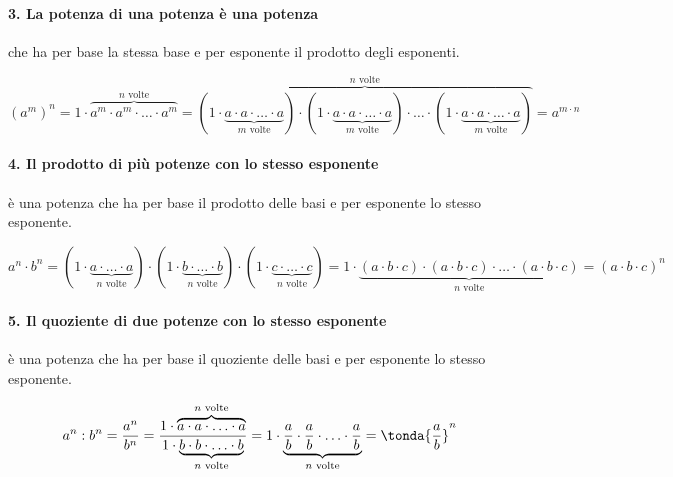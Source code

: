 \vspace{-1.5em}
\paragraph{3. La potenza di una potenza è una potenza} 
che ha per base la stessa base e per esponente il prodotto degli esponenti.

\[(a^m)^n =
1 \cdot \overbrace{a^m\cdot a^m\cdot\ldots\cdot a^m}^{n\text{ volte}}%
 =\overbrace{(1 \cdot \underbrace{a\cdot a\cdot\ldots\cdot a}_{m\text{ 
volte}})\cdot%
   (1 \cdot \underbrace{a\cdot a\cdot\ldots\cdot a}_{m\text{ 
volte}})\cdot\ldots\cdot%
   (1 \cdot \underbrace{a\cdot a\cdot\ldots\cdot a}_{m\text{ 
volte}})}^{n\text{ volte}}%
   =a^{m\cdot n}\]
   
\vspace{-1.5em}
\paragraph{4. Il prodotto di più potenze con lo stesso esponente} 
è una potenza che ha per base il prodotto delle basi e per esponente lo stesso
esponente.

\[a^n \cdot b^n=
  (1 \cdot \underbrace{a \cdot \ldots \cdot a}_{n\text{ volte}}) \cdot
  (1 \cdot \underbrace{b \cdot \ldots \cdot b}_{n\text{ volte}}) \cdot
  (1 \cdot \underbrace{c \cdot \ldots \cdot c}_{n\text{ volte}})=
  1 \cdot \underbrace{(a \cdot b \cdot c) \cdot (a \cdot b \cdot c) \cdot
              \ldots \cdot (a \cdot b \cdot c)}_{n\text{ volte}}=
   (a \cdot b \cdot c)^n\]
   
\vspace{-1.5em}
\paragraph{5. Il quoziente di due potenze con lo stesso esponente} 
è una potenza che ha per base il quoziente delle basi e per esponente lo 
stesso esponente.

\[a^n : b^n = \frac{a^n}{b^n} = 
  \frac{1 \cdot \overbrace{a\cdot a\cdot\ldots\cdot a}^{n\text{ volte}} }
       {1 \cdot \underbrace{b\cdot b\cdot\ldots\cdot b}_{n\text{ volte}}}=
  1 \cdot \underbrace{\frac{a}{b}\cdot \frac{a}{b}\cdot\ldots\cdot
              \frac{a}{b}}_{n\text{ volte}}=
   \tonda{\frac{a}{b}}^n\]

